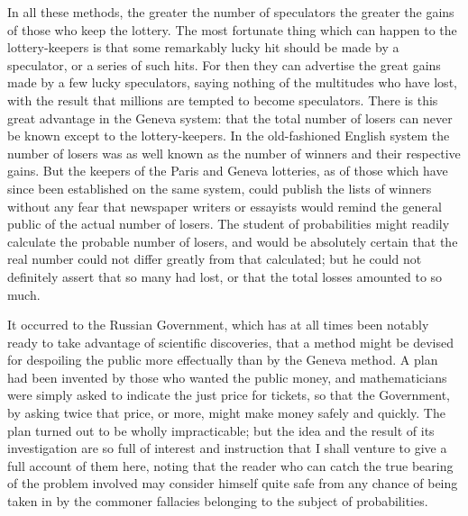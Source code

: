 \documentclass[letterpaper,12pt,oneside,openany]{memoir}
\begin{document}
In all these methods, the greater the number of
speculators the greater the gains of those who keep the
lottery. The most fortunate thing which can happen
to the lottery-keepers is that some remarkably lucky hit
should be made by a speculator, or a series of such hits.
For then they can advertise the great gains made by a
few lucky speculators, saying nothing of the multitudes
who have lost, with the result that millions are tempted
to become speculators. There is this great advantage
in the Geneva system: that the total number of losers
can never be known except to the lottery-keepers. In
the old-fashioned English system the number of losers
was as well known as the number of winners and their
respective gains. But the keepers of the Paris and
Geneva lotteries, as of those which have since been
established on the same system, could publish the lists
of winners without any fear that newspaper writers or
essayists would remind the general public of the actual
number of losers. The student of probabilities might
readily calculate the probable number of losers, and
would be absolutely certain that the real number could
not differ greatly from that calculated; but he could
not definitely assert that so many had lost, or that the
total losses amounted to so much.

It occurred to the Russian Government, which has
at all times been notably ready to take advantage of
scientific discoveries, that a method might be devised
for despoiling the public more effectually than by the
Geneva method. A plan had been invented by those
who wanted the public money, and mathematicians were
simply asked to indicate the just price for tickets, so
that the Government, by asking twice that price, or
more, might make money safely and quickly. The
plan turned out to be wholly impracticable; but the
idea and the result of its investigation are so full of
interest and instruction that I shall venture to give a
full account of them here, noting that the reader who
can catch the true bearing of the problem involved may
consider himself quite safe from any chance of being
taken in by the commoner fallacies belonging to the
subject of probabilities.
\end{document}
